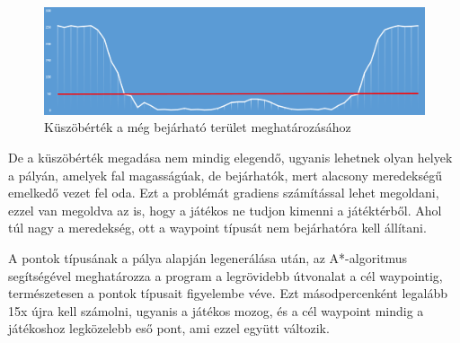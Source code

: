 \begin{figure}[h]
\centering
\includegraphics[scale=0.42]{kepek/magassagmezo_kuszobertek_diagram.png}
\caption{Küszöbérték a még bejárható terület meghatározásához}
\label{fig:kuszobertek}
\end{figure}

De a küszöbérték megadása nem mindig elegendő, ugyanis lehetnek olyan helyek a pályán, amelyek fal magasságúak, de bejárhatók, mert alacsony meredekségű emelkedő vezet fel oda. Ezt a problémát gradiens számítással lehet megoldani, ezzel van megoldva az is, hogy a játékos ne tudjon kimenni a játéktérből. Ahol túl nagy a meredekség, ott a waypoint típusát nem bejárhatóra kell állítani.

A pontok típusának a pálya alapján legenerálása után, az A*-algoritmus segítségével meghatározza a program a legrövidebb útvonalat a cél waypointig, természetesen a pontok típusait figyelembe véve. Ezt másodpercenként legalább 15x újra kell számolni, ugyanis a játékos mozog, és a cél waypoint mindig a játékoshoz legközelebb eső pont, ami ezzel együtt változik.
